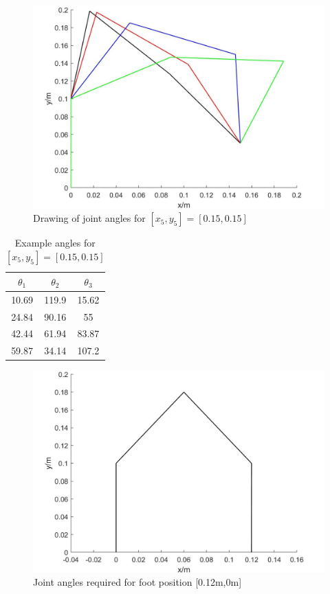 \documentclass[twoside,twocolumn]{article}
\begin{document}
\begin{figure}[h]
  \centering
    \includegraphics[width=\linewidth]{pos1}
  \caption{Drawing of joint angles for $[x_5,y_5]=[0.15,0.15]$}
  \label{fig:pos1}
\end{figure}

\begin{table}[h]
\centering 
\begin{tabular}{ c | c | c }
$\theta_1$&$\theta_2$&$\theta_3$\\ 

\midrule
10.69&119.9&15.62\\
24.84&90.16&55\\
42.44&61.94&83.87\\
59.87&34.14&107.2\\
\end{tabular}
\caption{Example angles for $[x_5,y_5]=[0.15,0.15]$}
\label{table:ang}
\end{table}

\begin{figure}[h]
  \centering
    \includegraphics[width=\linewidth]{pos2}
  \caption{Joint angles required for foot position [0.12m,0m]}
  \label{fig:pos2}
\end{figure}
\end{document}
